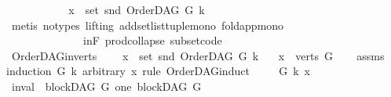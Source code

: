\begin{isabellebody}
\ \ \ \ \ \ \ \ \isamarkupfalse%
\ \isamarkupfalse%
\ {\isachardoublequoteopen}x\ {\isasymin}\ set\ {\isacharparenleft}{\kern0pt}snd\ {\isacharparenleft}{\kern0pt}OrderDAG\ G\ k{\isacharparenright}{\kern0pt}{\isacharparenright}{\kern0pt}{\isachardoublequoteclose}\isanewline
\ \ \ \ \ \ \ \ \ \ \isamarkupfalse%
\ {\isacharparenleft}{\kern0pt}metis\ {\isacharparenleft}{\kern0pt}no{\isacharunderscore}{\kern0pt}types{\isacharcomma}{\kern0pt}\ lifting{\isacharparenright}{\kern0pt}\ add{\isacharunderscore}{\kern0pt}set{\isacharunderscore}{\kern0pt}list{\isacharunderscore}{\kern0pt}tuple{\isacharunderscore}{\kern0pt}mono\ fold{\isacharunderscore}{\kern0pt}app{\isacharunderscore}{\kern0pt}mono{}\isanewline
\ \ \ \ \ \ \ \ \ \ \ \ \ \ in{\isacharunderscore}{\kern0pt}F\ prod{\isachardot}{\kern0pt}collapse\ subset{\isacharunderscore}{\kern0pt}code{\isacharparenleft}{\kern0pt}{}{\isacharparenright}{\kern0pt}{\isacharparenright}{\kern0pt}\ \ \isanewline
\ \ \ \ \ \ \isamarkupfalse%
\isanewline
\ \ \ \ \isamarkupfalse%
\isanewline
\ \ \isamarkupfalse%
\isanewline
{}\isamarkupfalse%
%
\endisatagproof
{\isafoldproof}%
%
\isadelimproof
\isanewline
%
\endisadelimproof
\isanewline
\isanewline
{}\isamarkupfalse%
\ OrderDAG{\isacharunderscore}{\kern0pt}in{\isacharunderscore}{\kern0pt}verts{\isacharcolon}{\kern0pt}\ \isanewline
\ \ \ {\isachardoublequoteopen}x\ {\isasymin}\ set\ {\isacharparenleft}{\kern0pt}snd\ {\isacharparenleft}{\kern0pt}OrderDAG\ G\ k{\isacharparenright}{\kern0pt}{\isacharparenright}{\kern0pt}{\isachardoublequoteclose}\isanewline
\ \ \ {\isachardoublequoteopen}x\ {\isasymin}\ verts\ G{\isachardoublequoteclose}\isanewline
%
\isadelimproof
\ \ %
\endisadelimproof
%
\isatagproof
{}\isamarkupfalse%
\ assms\isanewline
{}\isamarkupfalse%
{\isacharparenleft}{\kern0pt}induction\ G\ k\ arbitrary{\isacharcolon}{\kern0pt}\ x\ rule{\isacharcolon}{\kern0pt}\ OrderDAG{\isachardot}{\kern0pt}induct{\isacharparenright}{\kern0pt}\isanewline
\ \ \isamarkupfalse%
\ {\isacharparenleft}{\kern0pt}{}\ G\ k\ x{\isacharparenright}{\kern0pt}\isanewline
\ \ \isamarkupfalse%
\ {\isacharparenleft}{\kern0pt}inval{\isacharparenright}{\kern0pt}\ {\isachardoublequoteopen}{\isasymnot}\ blockDAG\ G{\isachardoublequoteclose}{\isacharbar}{\kern0pt}\ {\isacharparenleft}{\kern0pt}one{\isacharparenright}{\kern0pt}\ {\isachardoublequoteopen}blockDAG\ G\ {\isasymand}\isanewline

\end{isabellebody}
